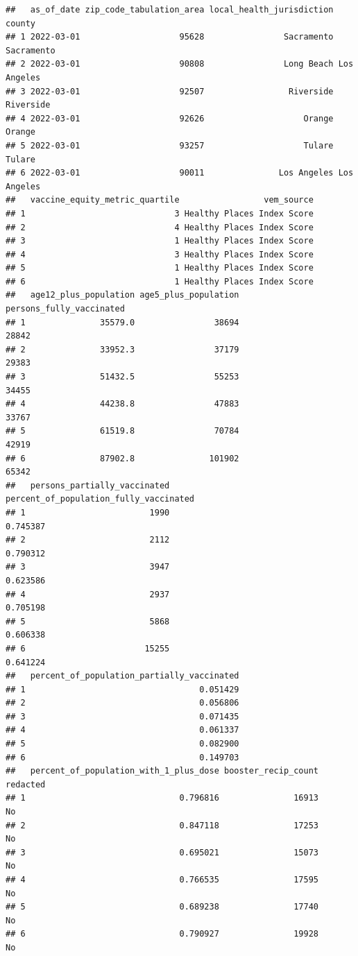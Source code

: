 \documentclass[
]{article}
\begin{document}
\begin{verbatim}
##   as_of_date zip_code_tabulation_area local_health_jurisdiction      county
## 1 2022-03-01                    95628                Sacramento  Sacramento
## 2 2022-03-01                    90808                Long Beach Los Angeles
## 3 2022-03-01                    92507                 Riverside   Riverside
## 4 2022-03-01                    92626                    Orange      Orange
## 5 2022-03-01                    93257                    Tulare      Tulare
## 6 2022-03-01                    90011               Los Angeles Los Angeles
##   vaccine_equity_metric_quartile                 vem_source
## 1                              3 Healthy Places Index Score
## 2                              4 Healthy Places Index Score
## 3                              1 Healthy Places Index Score
## 4                              3 Healthy Places Index Score
## 5                              1 Healthy Places Index Score
## 6                              1 Healthy Places Index Score
##   age12_plus_population age5_plus_population persons_fully_vaccinated
## 1               35579.0                38694                    28842
## 2               33952.3                37179                    29383
## 3               51432.5                55253                    34455
## 4               44238.8                47883                    33767
## 5               61519.8                70784                    42919
## 6               87902.8               101902                    65342
##   persons_partially_vaccinated percent_of_population_fully_vaccinated
## 1                         1990                               0.745387
## 2                         2112                               0.790312
## 3                         3947                               0.623586
## 4                         2937                               0.705198
## 5                         5868                               0.606338
## 6                        15255                               0.641224
##   percent_of_population_partially_vaccinated
## 1                                   0.051429
## 2                                   0.056806
## 3                                   0.071435
## 4                                   0.061337
## 5                                   0.082900
## 6                                   0.149703
##   percent_of_population_with_1_plus_dose booster_recip_count redacted
## 1                               0.796816               16913       No
## 2                               0.847118               17253       No
## 3                               0.695021               15073       No
## 4                               0.766535               17595       No
## 5                               0.689238               17740       No
## 6                               0.790927               19928       No
\end{verbatim}
\end{document}
